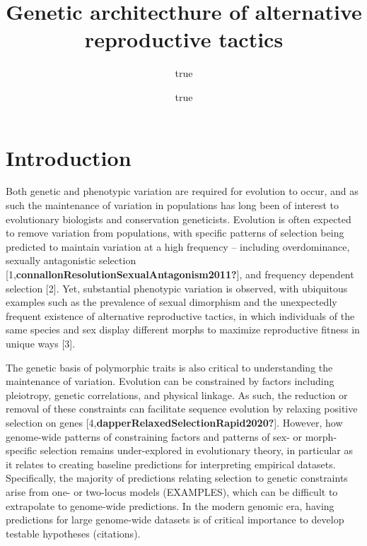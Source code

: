\documentclass[
  11pt,
]{article}
\title{Genetic architecthure of alternative reproductive tactics}
\author{true \and true}
\date{}
\begin{document}
\maketitle

\hypertarget{introduction}{%
\section{Introduction}\label{introduction}}

Both genetic and phenotypic variation are required for evolution to
occur, and as such the maintenance of variation in populations has long
been of interest to evolutionary biologists and conservation
geneticists. Evolution is often expected to remove variation from
populations, with specific patterns of selection being predicted to
maintain variation at a high frequency -- including overdominance,
sexually antagonistic selection
{[}1,\textbf{connallonResolutionSexualAntagonism2011?}{]}, and frequency dependent
selection {[}2{]}. Yet, substantial phenotypic
variation is observed, with ubiquitous examples such as the prevalence
of sexual dimorphism and the unexpectedly frequent existence of
alternative reproductive tactics, in which individuals of the same
species and sex display different morphs to maximize reproductive
fitness in unique ways {[}3{]}.

The genetic basis of polymorphic traits is also critical to
understanding the maintenance of variation. Evolution can be constrained
by factors including pleiotropy, genetic correlations, and physical
linkage. As such, the reduction or removal of these constraints can
facilitate sequence evolution by relaxing positive selection on genes
{[}4,\textbf{dapperRelaxedSelectionRapid2020?}{]}.
However, how genome-wide patterns of constraining factors and patterns of sex- or morph-specific selection remains under-explored in evolutionary theory, in particular as it relates to creating baseline predictions for interpreting empirical datasets.
Specifically, the majority of predictions relating selection to genetic
constraints arise from one- or two-locus models (EXAMPLES), which can be
difficult to extrapolate to genome-wide predictions. In the modern
genomic era, having predictions for large genome-wide datasets is of
critical importance to develop testable hypotheses (citations).
\end{document}
